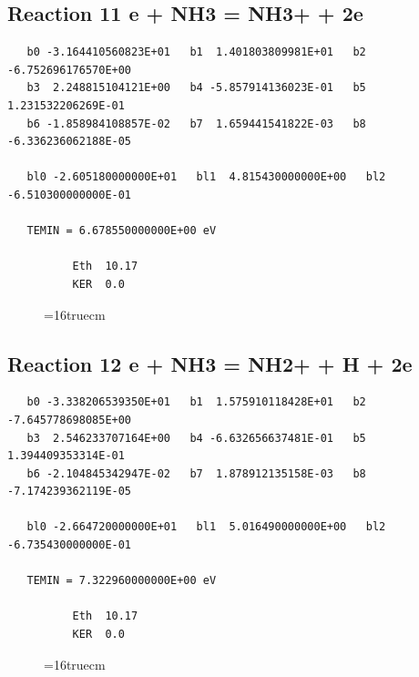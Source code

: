 \documentclass[12pt,dvipdfm]{article}
\begin{document}
\subsection{
Reaction 11 e + NH3 = NH3+ + 2e }
\begin{small}\begin{verbatim}
   b0 -3.164410560823E+01   b1  1.401803809981E+01   b2 -6.752696176570E+00
   b3  2.248815104121E+00   b4 -5.857914136023E-01   b5  1.231532206269E-01
   b6 -1.858984108857E-02   b7  1.659441541822E-03   b8 -6.336236062188E-05

   bl0 -2.605180000000E+01   bl1  4.815430000000E+00   bl2 -6.510300000000E-01

   TEMIN = 6.678550000000E+00 eV

          Eth  10.17
          KER  0.0
\end{verbatim}\end{small}
\begin{figure}[h!] \label{n2rates}
\epsfxsize=16truecm
\end{figure}
\newpage

\subsection{
Reaction 12 e + NH3 = NH2+ + H + 2e }
\begin{small}\begin{verbatim}
   b0 -3.338206539350E+01   b1  1.575910118428E+01   b2 -7.645778698085E+00
   b3  2.546233707164E+00   b4 -6.632656637481E-01   b5  1.394409353314E-01
   b6 -2.104845342947E-02   b7  1.878912135158E-03   b8 -7.174239362119E-05

   bl0 -2.664720000000E+01   bl1  5.016490000000E+00   bl2 -6.735430000000E-01

   TEMIN = 7.322960000000E+00 eV

          Eth  10.17
          KER  0.0
\end{verbatim}\end{small}
\begin{figure}[h!] \label{n2rates}
\epsfxsize=16truecm
\end{figure}
\newpage
\end{document}
